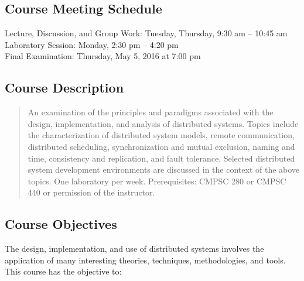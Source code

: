 \subsection*{Course Meeting Schedule}

Lecture, Discussion, and Group Work: Tuesday, Thursday, 9:30 am -- 10:45 am \\
Laboratory Session: Monday, 2:30 pm -- 4:20 pm \\
Final Examination: Thursday, May 5, 2016 at 7:00 pm

\subsection*{Course Description}

\begin{quote}

An examination of the principles and paradigms associated with the design, implementation, and analysis of distributed
systems. Topics include the characterization of distributed system models, remote communication, distributed scheduling,
synchronization and mutual exclusion, naming and time, consistency and replication, and fault tolerance. Selected
distributed system development environments are discussed in the context of the above topics. One laboratory per week.
Prerequisites: CMPSC 280 or CMPSC 440 or permission of the instructor.

\end{quote}

\subsection*{Course Objectives}

The design, implementation, and use of distributed systems involves the application of many interesting theories,
techniques, methodologies, and tools.  This course has the objective to:

